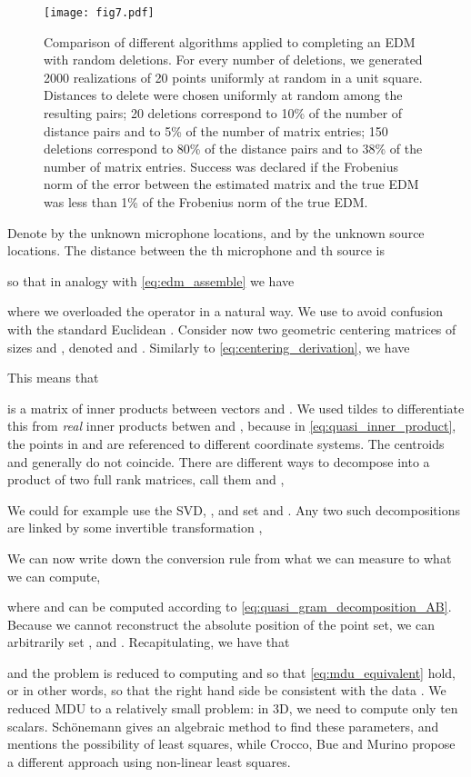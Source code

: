 \documentclass[10pt,double]{IEEEtran}
\newcommand{\rev}[1]{{#1}}
\begin{document}
\begin{figure}[t!]
  \centering
  \texttt{[image: fig7.pdf]}
  \caption{Comparison of different algorithms applied to completing an EDM
  with random deletions. For every number of deletions, we generated 2000
  realizations of 20 points uniformly at random in a unit square. Distances to
  delete were chosen uniformly at random among the resulting  pairs; \rev{20 deletions correspond to  10\% of the number of
  distance pairs and to 5\% of the number of matrix entries; 150 deletions
  correspond to  80\% of the distance pairs and to  38\% of
  the number of matrix entries.} Success was declared if the Frobenius norm of
  the error between the estimated matrix and the true EDM was less than 1\% of
  the Frobenius norm of the true EDM.}
  \label{fig:success_random}
\end{figure}


Denote by  the unknown microphone locations,
and by  the unknown source locations. The
distance between the th microphone and th source is

so that in analogy with \eqref{eq:edm_assemble} we have 

where we overloaded the  operator in a natural way. We use  to
avoid confusion with the standard Euclidean . Consider now two geometric
centering matrices of sizes  and , denoted  and . Similarly to \eqref{eq:centering_derivation}, we have

This means that

is a matrix of inner products between vectors  and .
We used tildes to differentiate this from \emph{real} inner products betwen
 and , because in \eqref{eq:quasi_inner_product}, the points in
 and  are referenced to different coordinate systems. The
centroids  and  generally do not coincide. There are different
ways to decompose  into a product of two full rank matrices, call
them  and ,

We could for example use the SVD, , and set
 and . Any two such decompositions are
linked by some invertible transformation ,

We can now write down the conversion rule from what we can measure to what we
can compute,

where  and  can be computed according to
\eqref{eq:quasi_gram_decomposition_AB}. Because we cannot reconstruct the
absolute position of the point set, we can arbitrarily set , and
. Recapitulating, we have that

and the problem is reduced to computing  and  so that
\eqref{eq:mdu_equivalent} hold, or in other words, so that the right hand
side be consistent with the data . We reduced MDU to a relatively
small problem: in 3D, we need to compute only ten scalars. Sch\"onemann
\cite{Schonemann:1970wd} gives an algebraic method to find these parameters,
and mentions the possibility of least squares, while Crocco, Bue and Murino
\cite{Crocco:2012eu} propose a different approach using non-linear least
squares.
\end{document}
